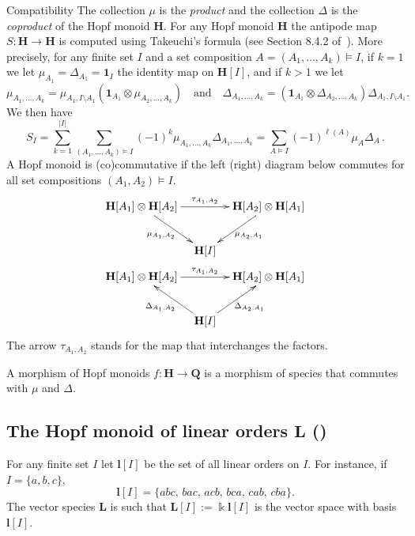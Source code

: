 \documentclass[10pt]{amsart}
\theoremstyle{definition}
\newenvironment{enonce*}[2][]{\par\smallskip\noindent\textbf{#2}.\par\nobreak}{\par\smallskip}
\newenvironment{compatibility}{\begin{enonce*}[remark]{Compatibility}}{\end{enonce*}}
\def\Id{\mathbf{1}}
\def\field{\Bbbk}
\newcommand{\rL}{\mathbf{l}}
\newcommand{\bL}{\mathbf{L}}
\newcommand{\bH}{\mathbf{H}}
\begin{document}
\begin{compatibility}
The collection $\mu$ is the \emph{product} and the collection $\Delta$
is the \emph{coproduct} of the Hopf monoid $\bH$. For any Hopf monoid $\bH$ the antipode map $S\colon \bH\to\bH$ is computed using Takeuchi's formula (see Section 8.4.2 of~\cite{AM:2010}). More precisely, for any finite set $I$ and a set composition $A=(A_1,\ldots,A_k)\models I$, if $k=1$ we let $\mu_{A_1}=\Delta_{A_1}=\Id_I$ the identity map on $\bH[I]$, and if $k>1$ we let
 $$ \mu_{A_1,\ldots,A_k} = \mu_{A_1,I\setminus A_1}(\Id_{A_1}\otimes\mu_{A_2,\ldots,A_k})\quad\text{and}\quad
 \Delta_{A_1,\ldots,A_k} =(\Id_{A_1}\otimes\Delta_{A_2,\ldots,A_k}) \Delta_{A_1,I\setminus A_1}.
 $$
We then have
\begin{equation}\label{eq:takeuchi}
 S_I = \sum_{k=1}^{|I|}\sum_{(A_1,\ldots,A_k)\models I} (-1)^{k} \mu_{A_1,\ldots,A_k} \Delta_{A_1,\ldots,A_k}
 = \sum_{A\models I} (-1)^{\ell(A)} \mu_A \Delta_A\,.
\end{equation}
A Hopf monoid is (co)commutative if the left (right) diagram below commutes
for all set compositions $(A_1,A_2)\models I$.
\begin{equation}\label{e:comm}
\begin{gathered}
\xymatrix@C-15pt{
\bH[A_1]\otimes\bH[A_2] \ar[rr]^-{\tau_{A_1,A_2}} \ar[rd]_{\mu_{A_1,A_2}} & & \bH[A_2]\otimes\bH[A_1] \ar[ld]^{\mu_{A_2,A_1}} \\
& \bH[I] &
}
\\
\xymatrix@C-15pt{
\bH[A_1]\otimes\bH[A_2] \ar[rr]^-{\tau_{A_1,A_2}} & &\bH[A_2]\otimes\bH[A_1] \\
& \bH[I] \ar[lu]^{\Delta_{A_1,A_2}} \ar[ru]_{\Delta_{A_2,A_1}} &
}
\end{gathered}
\end{equation}
The arrow $\tau_{A_1,A_2}$ stands for
the map that interchanges the factors.

A morphism of Hopf monoids $f:\bH\to\mathbf{Q}$ is a morphism of species that
commutes with $\mu$ and $\Delta$.
\end{compatibility}


\subsection{The Hopf monoid of linear orders \texorpdfstring{$\bL$ (\cite{AM:2010})}{L ([4])}}\label{ss:order}

For any finite set $I$ let
$\rL[I]$ be the set of all linear orders on $I$. For instance, if $I=\{a,b,c\}$,
\[
\rL[I]=\{abc,\,bac,\,acb,\,bca,\,cab,\,cba\}.
\]
The vector species $\bL$ is such that $\bL[I]:=\field\rL[I]$ is the vector space with basis $\rL[I]$. 
\end{document}
